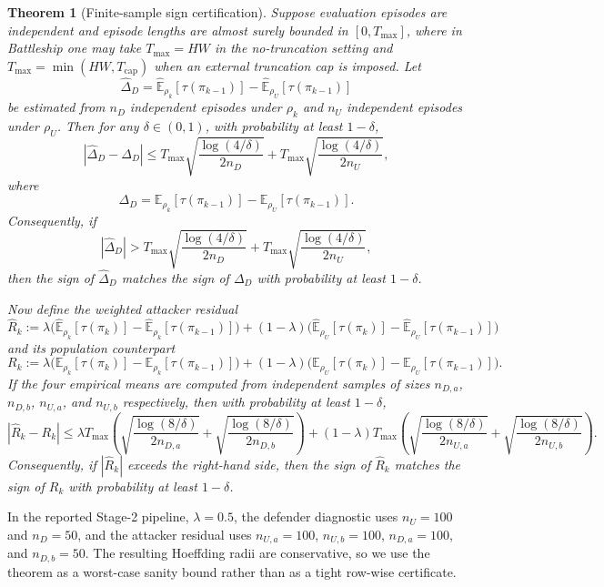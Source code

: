 \documentclass[11pt]{article}
\newtheorem{theorem}{Theorem}
\newcommand{\E}{\mathbb{E}}
\newcommand{\tauT}{\tau}
\begin{document}
\begin{theorem}[Finite-sample sign certification]
Suppose evaluation episodes are independent and episode lengths are almost surely bounded in $[0,T_{\max}]$, where in Battleship one may take $T_{\max}=HW$ in the no-truncation setting and $T_{\max}=\min(HW,T_{\mathrm{cap}})$ when an external truncation cap is imposed.
Let
\[
\widehat{\Delta}_D
=
\widehat{\E}_{\rho_k}[\tauT(\pi_{k-1})]-\widehat{\E}_{\rho_U}[\tauT(\pi_{k-1})]
\]
be estimated from $n_D$ independent episodes under $\rho_k$ and $n_U$ independent episodes under $\rho_U$. Then for any $\delta\in(0,1)$, with probability at least $1-\delta$,
\[
\left|\widehat{\Delta}_D-\Delta_D\right|
\le
T_{\max}\sqrt{\frac{\log(4/\delta)}{2n_D}}
+
T_{\max}\sqrt{\frac{\log(4/\delta)}{2n_U}},
\]
where
\[
\Delta_D
=
\E_{\rho_k}[\tauT(\pi_{k-1})]-\E_{\rho_U}[\tauT(\pi_{k-1})].
\]
Consequently, if
\[
|\widehat{\Delta}_D|
>
T_{\max}\sqrt{\frac{\log(4/\delta)}{2n_D}}
+
T_{\max}\sqrt{\frac{\log(4/\delta)}{2n_U}},
\]
then the sign of $\widehat{\Delta}_D$ matches the sign of $\Delta_D$ with probability at least $1-\delta$.
\par
Now define the weighted attacker residual
\[
\widehat{R}_k
:=
\lambda\Big(\widehat{\E}_{\rho_k}[\tauT(\pi_k)]-\widehat{\E}_{\rho_k}[\tauT(\pi_{k-1})]\Big)
+
(1-\lambda)\Big(\widehat{\E}_{\rho_U}[\tauT(\pi_k)]-\widehat{\E}_{\rho_U}[\tauT(\pi_{k-1})]\Big)
\]
and its population counterpart
\[
R_k
:=
\lambda\Big(\E_{\rho_k}[\tauT(\pi_k)]-\E_{\rho_k}[\tauT(\pi_{k-1})]\Big)
+
(1-\lambda)\Big(\E_{\rho_U}[\tauT(\pi_k)]-\E_{\rho_U}[\tauT(\pi_{k-1})]\Big).
\]
If the four empirical means are computed from independent samples of sizes $n_{D,a}$, $n_{D,b}$, $n_{U,a}$, and $n_{U,b}$ respectively, then with probability at least $1-\delta$,
\[
|\widehat{R}_k-R_k|
\le
\lambda T_{\max}\left(
\sqrt{\frac{\log(8/\delta)}{2n_{D,a}}}
+
\sqrt{\frac{\log(8/\delta)}{2n_{D,b}}}
\right)
+
(1-\lambda)T_{\max}\left(
\sqrt{\frac{\log(8/\delta)}{2n_{U,a}}}
+
\sqrt{\frac{\log(8/\delta)}{2n_{U,b}}}
\right).
\]
Consequently, if $|\widehat{R}_k|$ exceeds the right-hand side, then the sign of $\widehat{R}_k$ matches the sign of $R_k$ with probability at least $1-\delta$.
\end{theorem}

In the reported Stage-2 pipeline, $\lambda=0.5$, the defender diagnostic uses $n_U=100$ and $n_D=50$, and the attacker residual uses $n_{U,a}=100$, $n_{U,b}=100$, $n_{D,a}=100$, and $n_{D,b}=50$. The resulting Hoeffding radii are conservative, so we use the theorem as a worst-case sanity bound rather than as a tight row-wise certificate.
\end{document}
